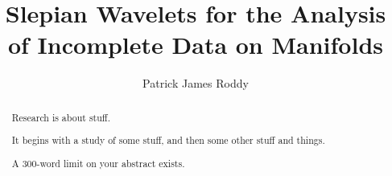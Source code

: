 
\title{Slepian Wavelets for the Analysis of Incomplete Data on Manifolds}
\author{Patrick James Roddy}

\maketitle
\makedeclaration{}

\begin{abstract} %
	Research is about stuff.

	It begins with a study of some stuff, and then some other stuff and things.

	A 300-word limit on your abstract exists.
\end{abstract}


